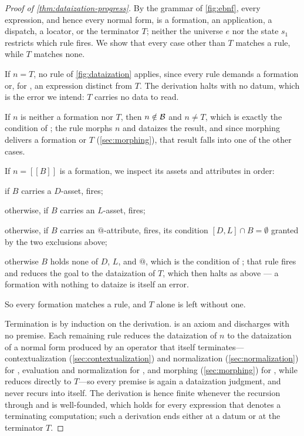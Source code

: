 
\begin{proof}[Proof of \cref{thm:dataization-progress}]
By the grammar of \cref{fig:ebnf}, every expression, and hence every normal form,
  is a formation, an application, a dispatch, a locator, or the terminator $T$;
  neither the universe \(e\) nor the state \(s_1\) restricts which rule fires.
We show that every case other than $T$ matches a rule, while $T$ matches none.

If $n = T$, no rule of \cref{fig:dataization} applies, since every rule demands
  a formation or, for , an expression distinct from $T$.
The derivation halts with no datum, which is the error we intend: $T$ carries
  no data to read.

If \(n\) is neither a formation nor $T$,
  then \(n \notin \mathcal{B}\) and $n \neq T$,
  which is exactly the condition of ;
  the rule morphs \(n\) and dataizes the result,
  and since morphing delivers a formation or $T$ (\cref{sec:morphing}),
  that result falls into one of the other cases.

If $n = [[ B ]]$ is a formation, we inspect its assets and attributes in order:
  \begin{inparaenum}[a)]
  \item if \(B\) carries a $D$-asset,  fires;
  \item otherwise, if \(B\) carries an $L$-asset,  fires;
  \item otherwise, if \(B\) carries an $@$-attribute,  fires,
    its condition $[D, L] \cap B = \emptyset$ granted by the two exclusions above;
  \item otherwise \(B\) holds none of $D$, $L$, and $@$,
    which is the condition of ; that rule fires and reduces
    the goal to the dataization of $T$, which then halts as above --- a
    formation with nothing to dataize is itself an error.
  \end{inparaenum}
So every formation matches a rule, and $T$ alone is left without one.

Termination is by induction on the derivation.
 is an axiom and discharges with no premise.
Each remaining rule reduces the dataization of \(n\) to the dataization of a normal
  form produced by an operator that itself terminates---contextualization
  (\cref{sec:contextualization}) and normalization (\cref{sec:normalization})
  for , evaluation and normalization for ,
  and morphing (\cref{sec:morphing}) for , while 
  reduces directly to $T$---so every premise is again a dataization judgment,
  and  never recurs into itself.
The derivation is hence finite whenever the recursion through 
  and  is well-founded,
  which holds for every expression that denotes a terminating computation;
  such a derivation ends either at a datum or at the terminator $T$.
\end{proof}
